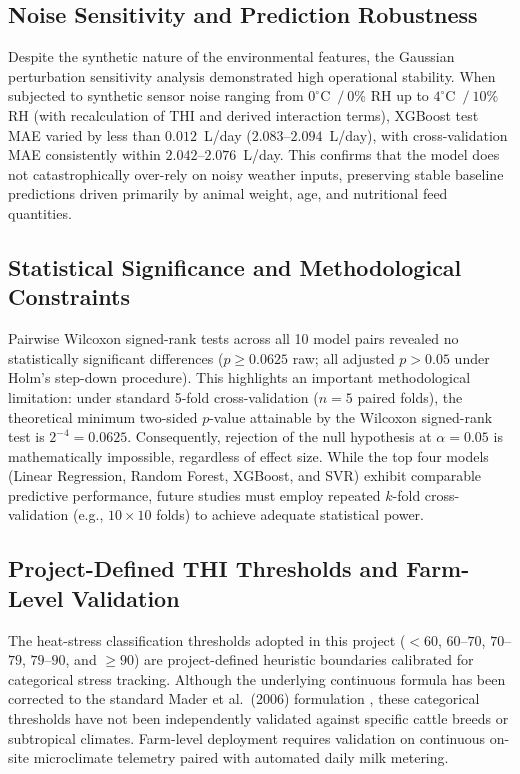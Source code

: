 \documentclass[conference]{IEEEtran}
\begin{document}
	\subsection{Noise Sensitivity and Prediction Robustness}
	Despite the synthetic nature of the environmental features, the Gaussian perturbation sensitivity analysis demonstrated high operational stability. When subjected to synthetic sensor noise ranging from $0^\circ$C~$/~0\%$ RH up to $4^\circ$C~$/~10\%$ RH (with recalculation of THI and derived interaction terms), XGBoost test MAE varied by less than $0.012$~L/day ($2.083$--$2.094$~L/day), with cross-validation MAE consistently within $2.042$--$2.076$~L/day. This confirms that the model does not catastrophically over-rely on noisy weather inputs, preserving stable baseline predictions driven primarily by animal weight, age, and nutritional feed quantities.
	
	\subsection{Statistical Significance and Methodological Constraints}
	Pairwise Wilcoxon signed-rank tests across all 10 model pairs revealed no statistically significant differences ($p \geq 0.0625$ raw; all adjusted $p > 0.05$ under Holm's step-down procedure). This highlights an important methodological limitation: under standard 5-fold cross-validation ($n=5$ paired folds), the theoretical minimum two-sided $p$-value attainable by the Wilcoxon signed-rank test is $2^{-4} = 0.0625$. Consequently, rejection of the null hypothesis at $\alpha = 0.05$ is mathematically impossible, regardless of effect size. While the top four models (Linear Regression, Random Forest, XGBoost, and SVR) exhibit comparable predictive performance, future studies must employ repeated $k$-fold cross-validation (e.g., $10 \times 10$ folds) to achieve adequate statistical power.
	
	\subsection{Project-Defined THI Thresholds and Farm-Level Validation}
	The heat-stress classification thresholds adopted in this project ($<60$, $60$--$70$, $70$--$79$, $79$--$90$, and $\geq 90$) are project-defined heuristic boundaries calibrated for categorical stress tracking. Although the underlying continuous formula has been corrected to the standard Mader et al.\ (2006) formulation \cite{ref16}, these categorical thresholds have not been independently validated against specific cattle breeds or subtropical climates. Farm-level deployment requires validation on continuous on-site microclimate telemetry paired with automated daily milk metering.
\end{document}

